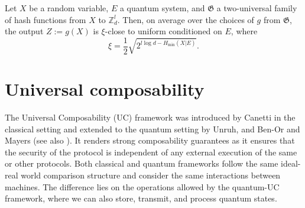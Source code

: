 
\begin{lemma}
Let $X$ be a random variable, $E$ a quantum system, and $\mathfrak{G}$ a two-universal family of hash functions from $X$ to $\mathbb{Z}_d^l$. Then, on average over the choices of $g$  from $\mathfrak{G}$, the output $Z := g(X)$ is $\xi$-close to uniform conditioned on $E$, where
\begin{equation}
  \xi = \frac{1}{2}\sqrt{2^{l\log d - H_\text{min}(X|E)}}.  
\end{equation}
 \label{lem:leftover}
\end{lemma}


\section{Universal composability}

The Universal Composability (UC) framework was introduced by Canetti \cite{C20} in the classical setting and extended to the quantum setting by Unruh, and Ben-Or and Mayers \cite{Unruh04, BenOrMay04}(see also \cite{Unruh10, FS09}).  It renders strong composability guarantees as it ensures that the security of the protocol is independent of any external execution of the same or other protocols.  Both classical and quantum frameworks follow the same ideal-real world comparison structure and consider the same interactions between machines. The difference lies on the operations allowed by the quantum-UC framework, where we can also store, transmit, and process  quantum states. 

